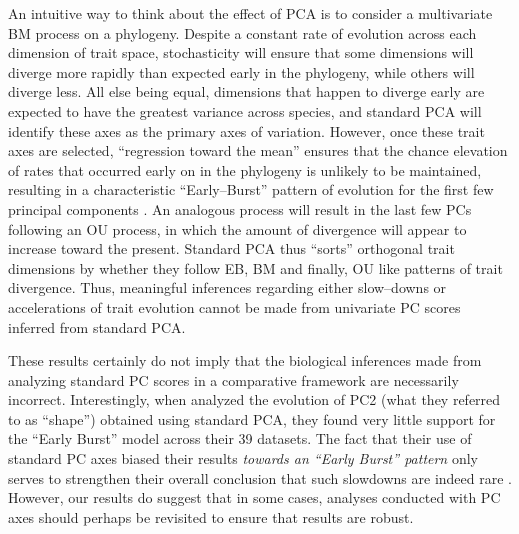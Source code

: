 \documentclass[a4paper,12pt]{article}
\begin{document}
An intuitive way to think about the effect of PCA is to consider a multivariate BM process on a phylogeny. Despite a constant rate of evolution across each dimension of trait space, stochasticity will ensure that some dimensions will diverge more rapidly than expected early in the phylogeny, while others will diverge less. All else being equal, dimensions that happen to diverge early are expected to have the greatest variance across species, and standard PCA will identify these axes as the primary axes of variation. However, once these trait axes are selected, ``regression toward the mean'' ensures that the chance elevation of rates that occurred early on in the phylogeny is unlikely to be maintained, resulting in a characteristic ``Early--Burst'' pattern of evolution for the first few principal components \citep[for a related point, see][]{Pennell2012}.
An analogous process will result in the last few PCs following an OU process, in which the amount of divergence will appear to increase toward the present. Standard PCA thus ``sorts'' orthogonal trait dimensions by whether they follow EB, BM and finally, OU like patterns of trait divergence. Thus, meaningful inferences regarding either slow--downs or accelerations of trait evolution cannot be made from univariate PC scores inferred from standard PCA. 

These results certainly do not imply that the biological inferences made from analyzing standard PC scores in a comparative framework are necessarily incorrect. %
Interestingly, when \citet{Harmon2010} analyzed the evolution of PC2 (what they referred to as ``shape'') obtained using standard PCA, they found very little support for the ``Early Burst'' model \citep{Blomberg2003} across their 39 datasets. The fact that their use of standard PC axes biased their results \emph{towards an ``Early Burst'' pattern} only serves to strengthen their overall conclusion that such slowdowns are indeed rare \citep[but see][]{SlaterPennell}. However, our results do suggest that in some cases, analyses conducted with PC axes should perhaps be revisited to ensure that results are robust.
\end{document}
